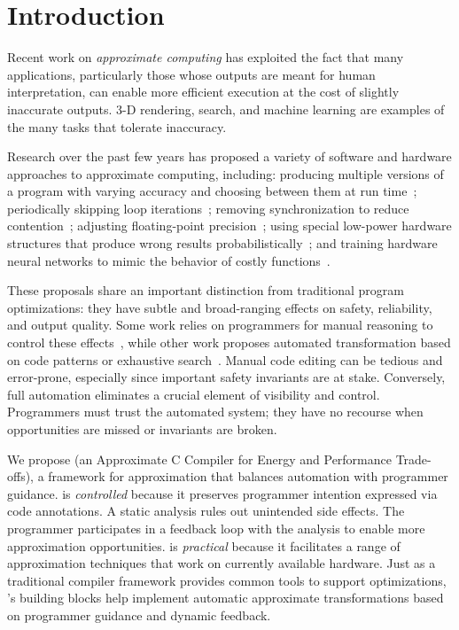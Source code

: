 \section{Introduction}\label{accept:sec:intro}

%
Recent work on \emph{approximate computing} has exploited the fact that 
many applications, particularly those whose outputs are meant for human
interpretation, can enable more efficient execution at the cost of slightly
inaccurate outputs. 3-D rendering, search, and machine learning
are examples of the many tasks that tolerate inaccuracy.

Research over the past few years has proposed a variety of software and hardware 
approaches to approximate computing, including:
%
producing multiple versions of a program with varying accuracy and choosing
between them at run
time~\cite{green, dynamicknobs};
%
periodically skipping loop iterations~\cite{perforation, qosprof};
%
removing synchronization to reduce contention~\cite{dubstep, quickstep, races-ibm};
%
adjusting floating-point precision~\cite{precimonious};
%
using special low-power hardware
structures that produce wrong results probabilistically~\cite{truffle, flikker};
%
and training hardware neural networks to mimic the behavior of costly
functions~\cite{npu, anpu}.

These proposals share an important distinction
from traditional program optimizations:
they have subtle and broad-ranging effects on safety, reliability, and output
quality.
Some work relies on programmers for manual reasoning to control
these
effects~\cite{npu, flikker, races-ibm, perforation},
while other work proposes automated transformation based on code
patterns or exhaustive search~\cite{green, paraprox, sage}.
Manual code editing can be tedious and error-prone, especially since
important safety invariants are at stake.
Conversely, full automation eliminates a crucial element of
visibility and control.
Programmers must trust the automated system; they have no recourse when
opportunities are missed or invariants are broken.

We propose \sysname
(an Approximate C Compiler for Energy and Performance Trade-offs),
a framework for approximation that balances automation with programmer
guidance.
\sysname is \emph{controlled} because it preserves programmer intention
expressed via code annotations.
A static analysis rules out
unintended side effects. The programmer participates in a feedback loop with
the analysis to enable more approximation
opportunities.
\sysname is \emph{practical} because it facilitates a range
of approximation techniques that work on currently available hardware.
Just as a traditional compiler framework provides common tools to support
optimizations,
\sysname's building blocks help implement automatic
approximate transformations based on programmer guidance and dynamic feedback.

